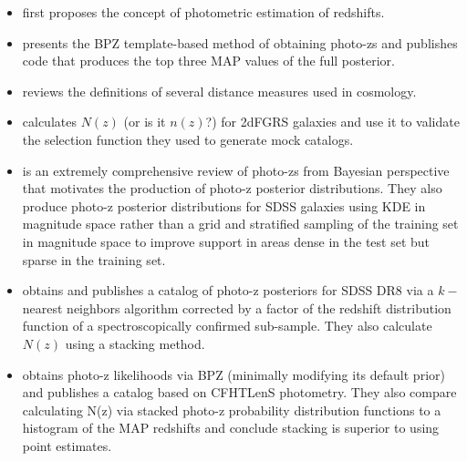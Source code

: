 \documentclass[preprint]{aastex}
\begin{document}
\begin{itemize}
\item \citet{Baum1962} first proposes the concept of photometric estimation of 
redshifts.
\item \citet{Benitez2000} presents the BPZ template-based method of obtaining 
photo-zs and publishes code that produces the top three MAP values of the full 
posterior.  
\item \citet{Hogg1999} reviews the definitions of several distance measures 
used in cosmology.
\item \citet{Norberg2002} calculates $N(z)$ (or is it $n(z)$?) for 2dFGRS 
galaxies and use it to validate the selection function they used to generate 
mock catalogs.
\item \citet{Budavari2009} is an extremely comprehensive review of photo-zs 
from Bayesian perspective that motivates the production of photo-z posterior 
distributions. They also produce photo-z posterior distributions for SDSS 
galaxies using KDE in magnitude space rather than a grid and stratified 
sampling of the training set in magnitude space to improve support in areas 
dense in the test set but sparse in the training set.
\item \citet{Sheldon2012} obtains and publishes a catalog of photo-z posteriors 
for SDSS DR8 via a $k-$ nearest neighbors algorithm corrected by a factor of 
the redshift distribution function of a spectroscopically confirmed sub-sample. 
 They also calculate $N(z)$ using a stacking method.
\item \citet{Hildebrandt2012} obtains photo-z likelihoods via BPZ (minimally 
modifying its default prior) and publishes a catalog based on CFHTLenS 
photometry.  They also compare calculating N(z) via stacked photo-z probability 
distribution functions to a histogram of the MAP redshifts and conclude 
stacking is superior to using point estimates.

\end{itemize}
\end{document}
